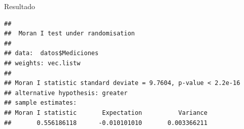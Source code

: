 \documentclass[
  11pt,
  ignorenonframetext,
]{beamer}
\begin{document}
\begin{frame}[fragile]{Resultado}
\protect\hypertarget{resultado}{}
\begin{verbatim}
## 
##  Moran I test under randomisation
## 
## data:  datos$Mediciones  
## weights: vec.listw    
## 
## Moran I statistic standard deviate = 9.7604, p-value < 2.2e-16
## alternative hypothesis: greater
## sample estimates:
## Moran I statistic       Expectation          Variance 
##       0.556186118      -0.010101010       0.003366211
\end{verbatim}
\end{frame}
\end{document}
